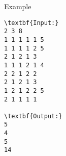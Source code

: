 Example
\begin{verbatim}
\textbf{Input:}
2 3 8
1 1 1 1 1 5
1 1 1 1 2 5
2 1 2 1 3
1 1 1 2 1 4
2 2 1 2 2
2 1 2 1 3
1 2 1 2 2 5
2 1 1 1 1

\textbf{Output:}
5
4
5
14
\end{verbatim}